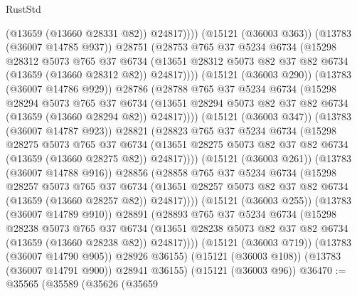 \begin{lexlean}{RustStd}
\begin{coremodule}
                          (@13659 (@13660 @28331 @82))
                          @24817))))
                  (@15121 (@36003 @363))
                  (@13783 (@36007 @14785 @937))
                  @28751
                  (@28753
                    @765
                    @37
                    @5234
                    @6734
                    (@15298
                      @28312
                      @5073
                      @765
                      @37
                      @6734
                      (@13651 @28312 @5073 @82 @37 @82 @6734 (@13659 (@13660 @28312 @82)) @24817))))
                (@15121 (@36003 @290))
                (@13783 (@36007 @14786 @929))
                @28786
                (@28788
                  @765
                  @37
                  @5234
                  @6734
                  (@15298
                    @28294
                    @5073
                    @765
                    @37
                    @6734
                    (@13651 @28294 @5073 @82 @37 @82 @6734 (@13659 (@13660 @28294 @82)) @24817))))
              (@15121 (@36003 @347))
              (@13783 (@36007 @14787 @923))
              @28821
              (@28823
                @765
                @37
                @5234
                @6734
                (@15298
                  @28275
                  @5073
                  @765
                  @37
                  @6734
                  (@13651 @28275 @5073 @82 @37 @82 @6734 (@13659 (@13660 @28275 @82)) @24817))))
            (@15121 (@36003 @261))
            (@13783 (@36007 @14788 @916))
            @28856
            (@28858
              @765
              @37
              @5234
              @6734
              (@15298
                @28257
                @5073
                @765
                @37
                @6734
                (@13651 @28257 @5073 @82 @37 @82 @6734 (@13659 (@13660 @28257 @82)) @24817))))
          (@15121 (@36003 @255))
          (@13783 (@36007 @14789 @910))
          @28891
          (@28893
            @765
            @37
            @5234
            @6734
            (@15298
              @28238
              @5073
              @765
              @37
              @6734
              (@13651 @28238 @5073 @82 @37 @82 @6734 (@13659 (@13660 @28238 @82)) @24817))))
        (@15121 (@36003 @719))
        (@13783 (@36007 @14790 @905))
        @28926
        @36155)
      (@15121 (@36003 @108))
      (@13783 (@36007 @14791 @900))
      @28941
      @36155)
    (@15121 (@36003 @96))
@36470 := @35565
    (@35589
      (@35626
        (@35659

\end{coremodule}
\end{lexlean}

